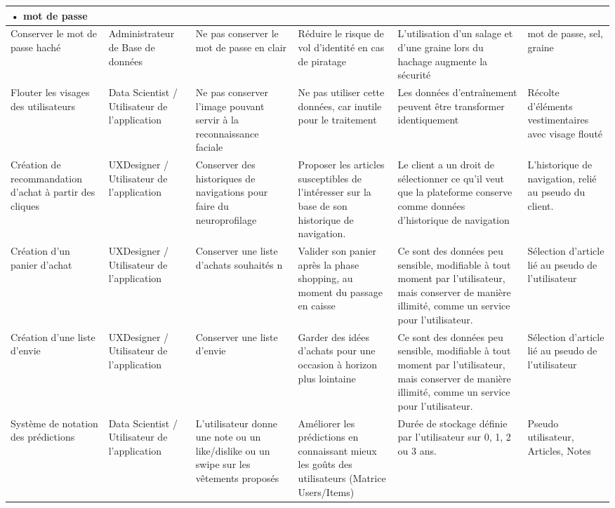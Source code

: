 \documentclass[12pt]{article}
\begin{document}
\begin{landscape}
\begin{table}[H]
\begin{tabular}{p{3cm}p{3cm}p{4cm}p{4cm}p{4cm}p{4cm}}
{•}  mot de passe 
\\
\hline   Conserver le mot de passe haché \cellcolor{gray!15} & Administrateur de Base de données \cellcolor{gray!15}& Ne pas conserver le mot de passe en clair \cellcolor{gray!15}& 
Réduire le risque de vol d’identité en cas de piratage  \cellcolor{gray!15}& 
L’utilisation d’un salage et d’une graine lors du hachage augmente la sécurité \cellcolor{gray!15}& mot de passe, sel, graine\cellcolor{gray!15}\\
\hline   Flouter les visages des utilisateurs & Data Scientist / Utilisateur de l’application & Ne pas conserver l’image pouvant servir à la reconnaissance faciale & Ne pas utiliser cette données, car inutile pour le traitement & Les données d’entraînement peuvent être transformer identiquement & Récolte d’éléments vestimentaires avec visage flouté\\
\hline   Création de recommandation d’achat à partir des cliques \cellcolor{gray!15}& UXDesigner / Utilisateur de l’application \cellcolor{gray!15}& Conserver des historiques de navigations pour faire du neuroprofilage  \cellcolor{gray!15}& Proposer les articles susceptibles de l’intéresser sur la base de son historique de navigation.  \cellcolor{gray!15}& Le client a un droit de sélectionner ce qu’il veut que la plateforme conserve comme données d’historique de navigation \cellcolor{gray!15}& L’historique de navigation, relié au pseudo du client. \cellcolor{gray!15}\\
\hline   Création d’un panier d’achat & UXDesigner / Utilisateur de l’application & Conserver une liste d’achats souhaités n & Valider son panier après la phase shopping, au moment du passage en caisse & Ce sont des données peu sensible, modifiable à tout moment par l’utilisateur, mais conserver de manière illimité, comme un service pour l’utilisateur. & Sélection d’article lié au pseudo de l’utilisateur \\
\hline   Création d’une liste d’envie \cellcolor{gray!15}& UXDesigner / Utilisateur de l’application \cellcolor{gray!15}& Conserver une liste d’envie \cellcolor{gray!15}& Garder des idées d’achats pour une occasion à horizon plus lointaine \cellcolor{gray!15}& Ce sont des données peu sensible, modifiable à tout moment par l’utilisateur, mais conserver de manière illimité, comme un service pour l’utilisateur. \cellcolor{gray!15}& Sélection d’article lié au pseudo de l’utilisateur \cellcolor{gray!15}\\
\hline   Système de notation des prédictions & Data Scientist / Utilisateur de l’application & L’utilisateur donne une note ou un like/dislike ou un swipe sur les vêtements proposés & Améliorer les prédictions en connaissant mieux les goûts des utilisateurs (Matrice Users/Items) & Durée de stockage définie par l’utilisateur sur 0, 1, 2 ou 3 ans. & Pseudo utilisateur, Articles, Notes \\

\end{tabular}
\end{table}
\end{landscape}
\end{document}
